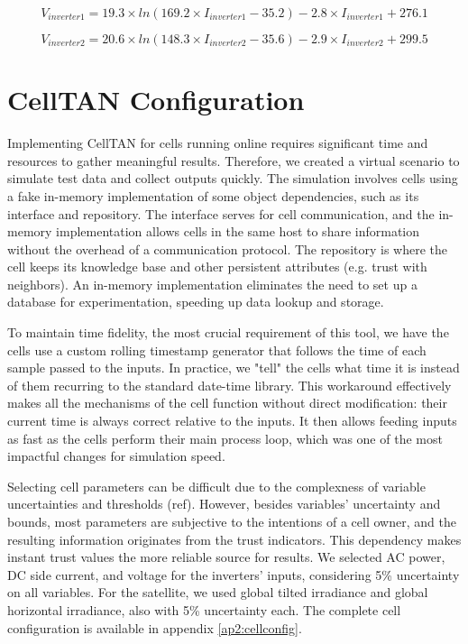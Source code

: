 $$
    V_{inverter1} = 19.3 \times ln(169.2 \times I_{inverter1} - 35.2) - 2.8 \times I_{inverter1} + 276.1
$$

$$
    V_{inverter2} = 20.6 \times ln(148.3 \times I_{inverter2} - 35.6) - 2.9 \times I_{inverter2} + 299.5 
$$

\section{CellTAN Configuration}

Implementing CellTAN for cells running online requires significant time and resources to gather meaningful results. Therefore, we created a virtual scenario to simulate test data and collect outputs quickly. The simulation involves cells using a fake in-memory implementation of some object dependencies, such as its interface and repository. The interface serves for cell communication, and the in-memory implementation allows cells in the same host to share information without the overhead of a communication protocol. The repository is where the cell keeps its knowledge base and other persistent attributes (e.g. trust with neighbors). An in-memory implementation eliminates the need to set up a database for experimentation, speeding up data lookup and storage.

To maintain time fidelity, the most crucial requirement of this tool, we have the cells use a custom rolling timestamp generator that follows the time of each sample passed to the inputs. In practice, we "tell" the cells what time it is instead of them recurring to the standard date-time library. This workaround effectively makes all the mechanisms of the cell function without direct modification: their current time is always correct relative to the inputs. It then allows feeding inputs as fast as the cells perform their main process loop, which was one of the most impactful changes for simulation speed.

Selecting cell parameters can be difficult due to the complexness of variable uncertainties and thresholds (ref). However, besides variables' uncertainty and bounds, most parameters are subjective to the intentions of a cell owner, and the resulting information originates from the trust indicators. This dependency makes instant trust values the more reliable source for results. We selected AC power, DC side current, and voltage for the inverters' inputs, considering 5\% uncertainty on all variables. For the satellite, we used global tilted irradiance and global horizontal irradiance, also with 5\% uncertainty each. The complete cell configuration is available in appendix \ref{ap2:cellconfig}.


